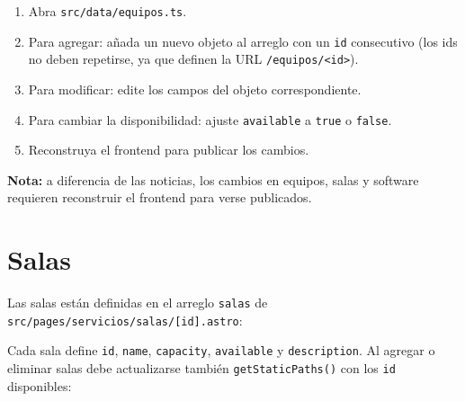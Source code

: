 \documentclass[12pt,a4paper]{report}
\begin{document}
\begin{enumerate}
  \item Abra \texttt{src/data/equipos.ts}.
  \item Para agregar: añada un nuevo objeto al arreglo con un \texttt{id}
        consecutivo (los ids no deben repetirse, ya que definen la URL
        \texttt{/equipos/<id>}).
  \item Para modificar: edite los campos del objeto correspondiente.
  \item Para cambiar la disponibilidad: ajuste \texttt{available} a
        \texttt{true} o \texttt{false}.
  \item Reconstruya el frontend para publicar los cambios.
\end{enumerate}

\begin{mdframed}[style=importantstyle]
  \textbf{Nota:} a diferencia de las noticias, los cambios en equipos, salas y
  software requieren reconstruir el frontend para verse publicados.
\end{mdframed}

\section{Salas}

Las salas están definidas en el arreglo \texttt{salas} de
\texttt{src/pages/servicios/salas/[id].astro}:


Cada sala define \texttt{id}, \texttt{name}, \texttt{capacity},
\texttt{available} y \texttt{description}. Al agregar o eliminar salas debe
actualizarse también \texttt{getStaticPaths()} con los \texttt{id}
disponibles:

\end{document}
